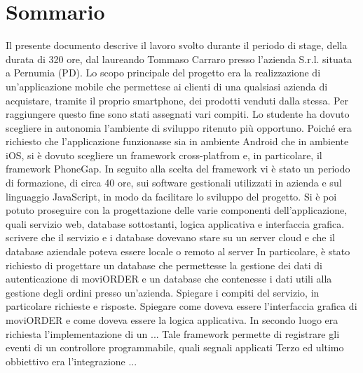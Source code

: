 
\cleardoublepage
{}
{}
\begingroup
\let\clearpage\relax
\let\cleardoublepage\relax
\let\cleardoublepage\relax

\chapter*{Sommario}

Il presente documento descrive il lavoro svolto durante il periodo di stage, della durata di 320 ore, dal laureando Tommaso Carraro presso l'azienda \visione{} S.r.l. situata a Pernumia (PD).
Lo scopo principale del progetto era la realizzazione di un'applicazione mobile che permettese ai clienti di una qualsiasi azienda di acquistare, tramite il proprio smartphone, dei prodotti venduti dalla stessa. Per raggiungere questo fine sono stati assegnati vari compiti.
Lo studente ha dovuto scegliere in autonomia l'ambiente di sviluppo ritenuto più opportuno. Poiché era richiesto che l'applicazione funzionasse sia in ambiente Android che in ambiente iOS, si è dovuto scegliere un framework cross-platfrom e, in particolare, il framework PhoneGap.
In seguito alla scelta del framework vi è stato un periodo di formazione, di circa 40 ore, sui software gestionali utilizzati in azienda e sul linguaggio JavaScript, in modo da facilitare lo sviluppo del progetto.
Si è poi potuto proseguire con la progettazione delle varie componenti dell'applicazione, quali servizio web, database sottostanti, logica applicativa e interfaccia grafica. 
scrivere che il servizio e i database dovevano stare su un server cloud e che il database aziendale poteva essere locale o remoto al server
In particolare, è stato richiesto di progettare un database che permettesse la gestione dei dati di autenticazione di moviORDER e un database che contenesse i dati utili alla gestione degli ordini presso un'azienda. 
Spiegare i compiti del servizio, in particolare richieste e risposte.
Spiegare come doveva essere l'interfaccia grafica di moviORDER e come doveva essere la logica applicativa.
In secondo luogo era richiesta l'implementazione di un ... 
Tale framework permette di registrare gli eventi di un controllore programmabile, quali segnali applicati 
Terzo ed ultimo obbiettivo era l'integrazione ...

%
%

\endgroup			

\vfill

